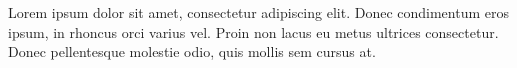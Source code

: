 \documentclass[../memoria.tex]{subfiles}
\begin{document}
Lorem ipsum dolor sit amet, consectetur adipiscing elit. Donec condimentum eros ipsum, in rhoncus orci varius
vel. Proin non lacus eu metus ultrices consectetur. Donec pellentesque molestie odio, quis mollis sem cursus at.
\end{document}
